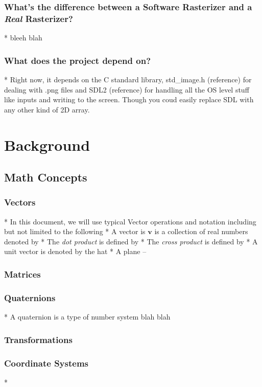 \documentclass{article}
\begin{document}
\subsubsection{What's the difference between a Software Rasterizer and a \textit{Real} Rasterizer?}
* bleeh blah 
\subsubsection{What does the project depend on?}
* Right now, it depends on the C standard library, std\_image.h (reference) for dealing with .png files and SDL2 (reference) for handling all the OS level stuff like inputs and writing to the screen. Though you coud easily replace SDL with any other kind of 2D array.

\section{Background}

\subsection{Math Concepts}
\subsubsection{Vectors}
* In this document, we will use typical Vector operations and notation including but not limited to the following
* A vector is $\textbf{v}$ is a collection of real numbers denoted by 
* The \textit{dot product} is defined by
* The \textit{cross product} is defined by
* A unit vector is denoted by the hat
* A plane --

\subsubsection{Matrices}

\subsubsection{Quaternions}
* A quaternion is a type of number system blah blah
\subsubsection{Transformations}

\subsubsection{Coordinate Systems}
* 
\end{document}
